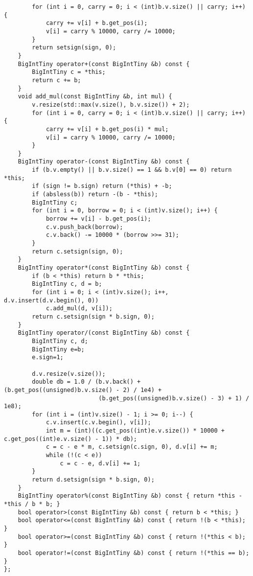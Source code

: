 \documentclass[UTF8]{ctexart}
\begin{document}
\begin{lstlisting}
        for (int i = 0, carry = 0; i < (int)b.v.size() || carry; i++) {
            carry += v[i] + b.get_pos(i);
            v[i] = carry % 10000, carry /= 10000;
        }
        return setsign(sign, 0);
    }
    BigIntTiny operator+(const BigIntTiny &b) const {
        BigIntTiny c = *this;
        return c += b;
    }
    void add_mul(const BigIntTiny &b, int mul) {
        v.resize(std::max(v.size(), b.v.size()) + 2);
        for (int i = 0, carry = 0; i < (int)b.v.size() || carry; i++) {
            carry += v[i] + b.get_pos(i) * mul;
            v[i] = carry % 10000, carry /= 10000;
        }
    }
    BigIntTiny operator-(const BigIntTiny &b) const {
        if (b.v.empty() || b.v.size() == 1 && b.v[0] == 0) return *this;
        if (sign != b.sign) return (*this) + -b;
        if (absless(b)) return -(b - *this);
        BigIntTiny c;
        for (int i = 0, borrow = 0; i < (int)v.size(); i++) {
            borrow += v[i] - b.get_pos(i);
            c.v.push_back(borrow);
            c.v.back() -= 10000 * (borrow >>= 31);
        }
        return c.setsign(sign, 0);
    }
    BigIntTiny operator*(const BigIntTiny &b) const {
        if (b < *this) return b * *this;
        BigIntTiny c, d = b;
        for (int i = 0; i < (int)v.size(); i++, d.v.insert(d.v.begin(), 0))
            c.add_mul(d, v[i]);
        return c.setsign(sign * b.sign, 0);
    }
    BigIntTiny operator/(const BigIntTiny &b) const {
        BigIntTiny c, d;
        BigIntTiny e=b;
        e.sign=1;

        d.v.resize(v.size());
        double db = 1.0 / (b.v.back() + (b.get_pos((unsigned)b.v.size() - 2) / 1e4) +
                           (b.get_pos((unsigned)b.v.size() - 3) + 1) / 1e8);
        for (int i = (int)v.size() - 1; i >= 0; i--) {
            c.v.insert(c.v.begin(), v[i]);
            int m = (int)((c.get_pos((int)e.v.size()) * 10000 + c.get_pos((int)e.v.size() - 1)) * db);
            c = c - e * m, c.setsign(c.sign, 0), d.v[i] += m;
            while (!(c < e))
                c = c - e, d.v[i] += 1;
        }
        return d.setsign(sign * b.sign, 0);
    }
    BigIntTiny operator%(const BigIntTiny &b) const { return *this - *this / b * b; }
    bool operator>(const BigIntTiny &b) const { return b < *this; }
    bool operator<=(const BigIntTiny &b) const { return !(b < *this); }
    bool operator>=(const BigIntTiny &b) const { return !(*this < b); }
    bool operator!=(const BigIntTiny &b) const { return !(*this == b); }
};
\end{lstlisting}
\end{document}

